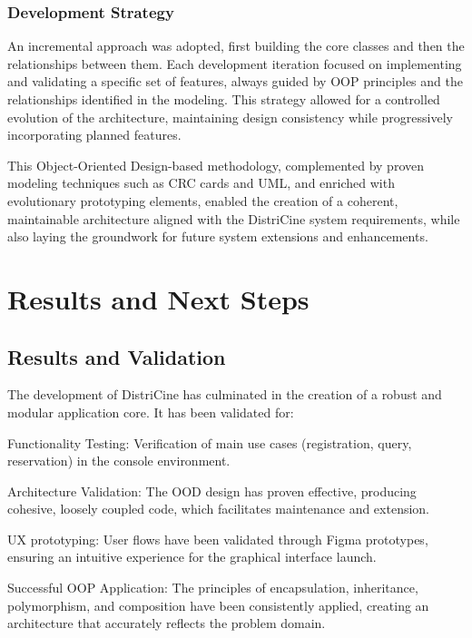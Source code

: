\documentclass[12pt]{article}
\begin{document}
\subsubsection{Development Strategy}
An incremental approach was adopted, first building the core classes and then the relationships between them. Each development iteration focused on implementing and validating a specific set of features, always guided by OOP principles and the relationships identified in the modeling. This strategy allowed for a controlled evolution of the architecture, maintaining design consistency while progressively incorporating planned features.

This Object-Oriented Design-based methodology, complemented by proven modeling techniques such as CRC cards and UML, and enriched with evolutionary prototyping elements, enabled the creation of a coherent, maintainable architecture aligned with the DistriCine system requirements, while also laying the groundwork for future system extensions and enhancements.

\section{Results and Next Steps}

\subsection{Results and Validation}
The development of DistriCine has culminated in the creation of a robust and modular application core. It has been validated for:
    \item Functionality Testing: Verification of main use cases (registration, query, reservation) in the console environment.
    \item Architecture Validation: The OOD design has proven effective, producing cohesive, loosely coupled code, which facilitates maintenance and extension.
    \item UX prototyping: User flows have been validated through Figma prototypes, ensuring an intuitive experience for the graphical interface launch.
    \item Successful OOP Application: The principles of encapsulation, inheritance, polymorphism, and composition have been consistently applied, creating an architecture that accurately reflects the problem domain.
\end{document}
